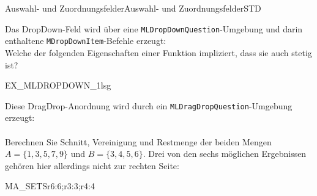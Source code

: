 \begin{MXContent}{Auswahl- und Zuordnungsfelder}{Auswahl- und Zuordnungsfelder}{STD}
\begin{MExample}
Das DropDown-Feld wird über eine \texttt{MLDropDownQuestion}-Umgebung und darin enthaltene \texttt{MDropDownItem}-Befehle erzeugt:
\ \\
Welche der folgenden Eigenschaften einer Funktion impliziert, dass sie auch stetig ist?
\begin{MLDropDownQuestion}{EX_MLDROPDOWN_1}{lsg}
\end{MLDropDownQuestion}
\end{MExample}

\begin{MExample}
Diese DragDrop-Anordnung wird durch ein \texttt{MLDragDropQuestion}-Umgebung erzeugt:
\ \\ \ \\
Berechnen Sie Schnitt, Vereinigung und Restmenge der beiden Mengen $ A = \{ 1,3,5,7,9\} $ und $B= \{ 3,4,5,6 \}.$ Drei von den sechs möglichen Ergebnissen gehören hier allerdings nicht zur rechten Seite:\ \\
\begin{MLDragDropQuestion}{MA_SETS}{r6:6;r3:3;r4:4}
\end{MLDragDropQuestion}
\end{MExample}

\end{MXContent}

